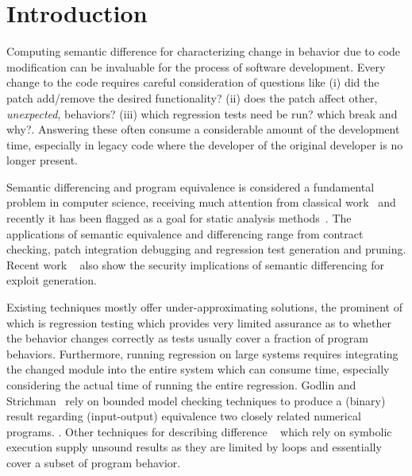 \section{Introduction} 



Computing semantic difference for characterizing change in behavior due to code modification can be invaluable for the process of software development. Every change to the code requires careful consideration of questions like (i) did the patch add/remove the desired functionality? (ii) does the patch affect other, \emph{unexpected}, behaviors? (iii) which regression tests need be run? which break and why?. Answering these often consume a considerable amount of the development time, especially in legacy code where the developer of the original developer is no longer present.

Semantic differencing and program equivalence is considered a fundamental problem in computer science, receiving much attention from classical work~\cite{} and recently it has been flagged as a goal for static analysis methods~\cite{}. The applications of semantic equivalence and differencing range from contract checking, patch integration debugging and regression test generation and pruning. Recent work ~\cite{} also show the security implications of semantic differencing for exploit generation.

Existing techniques mostly offer under-approximating solutions, the prominent of which is regression testing which provides very limited assurance as to whether the behavior changes correctly as tests usually cover a fraction of program behaviors. Furthermore, running regression on large systems requires integrating the changed module into the entire system which can consume time, especially considering the actual time of running the entire regression. Godlin and Strichman~\cite{GodlinStrichman09} rely on bounded model checking techniques to produce a (binary) result regarding (input-output) equivalence two closely related numerical programs. . Other techniques for describing difference
~\cite{DwyerElbaumPerson08,EnglerRamos12} which rely on
symbolic execution supply unsound results as they are limited by loops and
essentially cover a subset of program behavior. 

